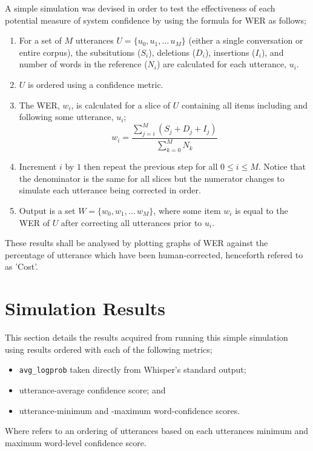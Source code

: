 A simple simulation was devised in order to test the effectiveness of each potential measure of system confidence by using the formula for WER as follows;

\begin{enumerate}
  \item For a set of $M$ utterances $U = \{ u_{0}, u_{1}, \ldots\, u_{M} \}$ (either a single conversation or entire corpus), the subsitutions ($S_i$), deletions ($D_i$), insertions ($I_i$), and number of words in the reference ($N_i$) are calculated for each utterance, $u_i$.
  \item $U$ is ordered using a confidence metric.
  \item The WER, $w_i$, is calculated for a slice of $U$ containing all items including and following some utterance, $u_i$;
    \[
      w_i = \frac{\sum_{j=i}^{M} (S_j + D_j + I_j)}{\sum_{k=0}^{M} N_k}
    \]
  \item Increment $i$ by $1$ then repeat the previous step for all $0 \leq i \leq M$.
    Notice that the denominator is the same for all slices but the numerator changes to simulate each utterance being corrected in order.
  \item Output is a set $W = \{ w_{0}, w_{1}, \ldots\, w_{M} \}$, where some item $w_{i}$ is equal to the WER of $U$ after correcting all utterances prior to $u_i$.
\end{enumerate}

These results shall be analysed by plotting graphs of WER against the percentage of utterance which have been human-corrected, henceforth refered to as 'Cost'.

\section{Simulation Results}

This section details the results acquired from running this simple simulation using results ordered with each of the following metrics;

\begin{itemize}
  \item \texttt{avg\_logprob} taken directly from Whisper's standard output;
  \item utterance-average confidence score; and
  \item utterance-minimum and -maximum word-confidence scores.
\end{itemize}

Where  refers to an ordering of utterances based on each utterances minimum and maximum word-level confidence score.

